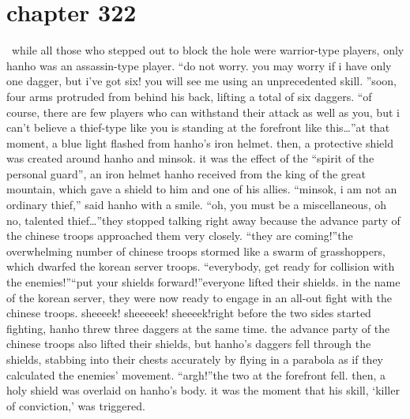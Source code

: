 \section{chapter 322}






 while all those who stepped out to block the hole were warrior-type players, only hanho was an assassin-type player.
“do not worry.
 you may worry if i have only one dagger, but i’ve got six! you will see me using an unprecedented skill.
”soon, four arms protruded from behind his back, lifting a total of six daggers.
“of course, there are few players who can withstand their attack as well as you, but i can’t believe a thief-type like you is standing at the forefront like this…”at that moment, a blue light flashed from hanho’s iron helmet.
 then, a protective shield was created around hanho and minsok.
 it was the effect of the “spirit of the personal guard”, an iron helmet hanho received from the king of the great mountain, which gave a shield to him and one of his allies.
“minsok, i am not an ordinary thief,” said hanho with a smile.
“oh, you must be a miscellaneous, oh no, talented thief…”they stopped talking right away because the advance party of the chinese troops approached them very closely.
“they are coming!”the overwhelming number of chinese troops stormed like a swarm of grasshoppers, which dwarfed the korean server troops.
“everybody, get ready for collision with the enemies!”“put your shields forward!”everyone lifted their shields.
 in the name of the korean server, they were now ready to engage in an all-out fight with the chinese troops.
sheeeek! sheeeeek! sheeeek!right before the two sides started fighting, hanho threw three daggers at the same time.
the advance party of the chinese troops also lifted their shields, but hanho’s daggers fell through the shields, stabbing into their chests accurately by flying in a parabola as if they calculated the enemies’ movement.
“argh!”the two at the forefront fell.
 then, a holy shield was overlaid on hanho’s body.
 it was the moment that his skill, ‘killer of conviction,’ was triggered.

